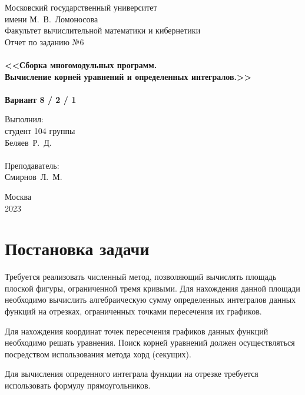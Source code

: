 \documentclass[a4paper,12pt,titlepage,finall]{article}
\begin{document}
\begin{titlepage}
    \begin{center}
	{\small \sc Московский государственный университет \\имени М.~В.~Ломоносова\\
	Факультет вычислительной математики и кибернетики\\}
	\vfill
	{\Large \sc Отчет по заданию №6}\\
	~\\
	{\large \bf <<Сборка многомодульных программ. \\
	Вычисление корней уравнений и определенных интегралов.>>}\\ 
	~\\
	{\large \bf Вариант 8 / 2 / 1}
    \end{center}
    \begin{flushright}
	\vfill {Выполнил:\\
	студент 104 группы\\
	Беляев~Р.~Д.\\
	~\\
	Преподаватель:\\
	Смирнов~Л.~М.}
    \end{flushright}
    \begin{center}
	\vfill
	{\small Москва\\2023}
    \end{center}
\end{titlepage}

\tableofcontents
\newpage

\section{Постановка задачи}

Требуется реализовать численный метод, позволяющий вычислять площадь плоской фигуры,
ограниченной тремя кривыми. Для нахождения данной площади необходимо вычислить алгебраическую сумму определенных интегралов данных функций на отрезках, ограниченных точками пересечения их графиков. 
\par 
Для нахождения координат точек пересечения графиков данных функций необходимо решать уравнения. Поиск корней уравнений должен осуществляться посредством использования метода хорд (секущих).
\par
Для вычисления опреденного интеграла функции на отрезке требуется использовать формулу прямоугольников.
\end{document}
